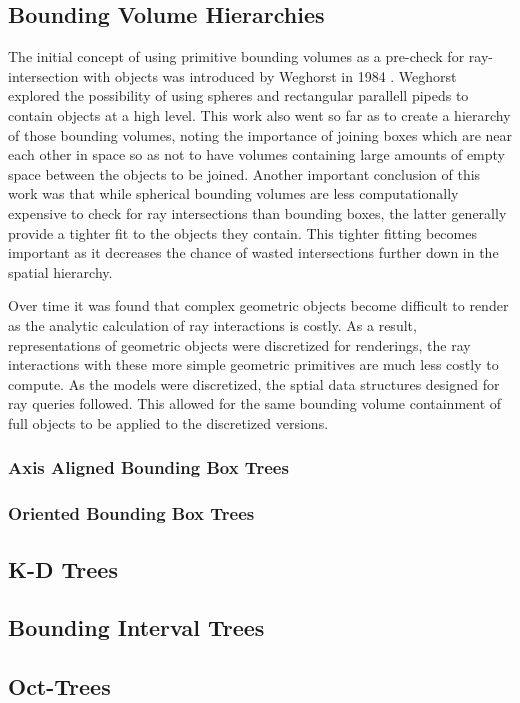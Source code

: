\documentclass{article}
\begin{document}
\subsection{Bounding Volume Hierarchies}

The initial concept of using primitive bounding volumes as a pre-check for ray-intersection with objects was introduced by Weghorst in 1984 \cite{Weghorst:1984:ICM}. Weghorst explored the possibility of using spheres and rectangular parallell pipeds to contain objects at a high level. This work also went so far as to create a hierarchy of those bounding volumes, noting the importance of joining boxes which are near each other in space so as not to have volumes containing large amounts of empty space between the objects to be joined. Another important conclusion of this work was that while spherical bounding volumes are less computationally expensive to check for ray intersections than bounding boxes, the latter generally provide a tighter fit to the objects they contain. This tighter fitting becomes important as it decreases the chance of wasted intersections further down in the spatial hierarchy.

Over time it was found that complex geometric objects become difficult to render as the analytic calculation of ray interactions is costly. As a result, representations of geometric objects were discretized for renderings, the ray interactions with these more simple geometric primitives are much less costly to compute. As the models were discretized, the sptial data structures designed for ray queries followed. This allowed for the same bounding volume containment of full objects to be applied to the discretized versions.


\subsubsection{Axis Aligned Bounding Box Trees}

\subsubsection{Oriented Bounding Box Trees}

\subsection{K-D Trees}

\subsection{Bounding Interval Trees}

\subsection{Oct-Trees}



\end{document}
